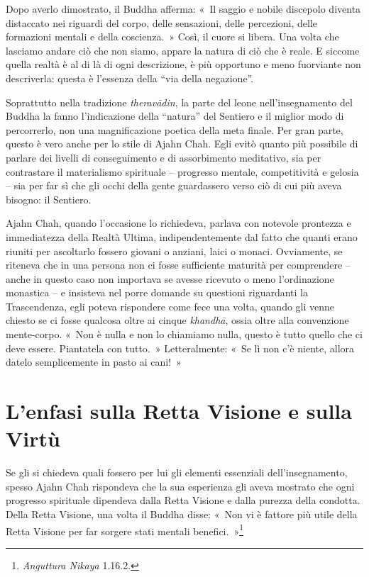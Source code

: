 Dopo averlo dimostrato, il Buddha afferma: «~Il saggio e nobile
discepolo diventa distaccato nei riguardi del corpo, delle sensazioni,
delle percezioni, delle formazioni mentali e della coscienza.~» Così, il
cuore si libera. Una volta che lasciamo andare ciò che non siamo, appare
la natura di ciò che è reale. E siccome quella realtà è al di là di ogni
descrizione, è più opportuno e meno fuorviante non descriverla: questa è
l'essenza della ``via della negazione''.

Soprattutto nella tradizione \emph{theravādin}, la parte del leone
nell'insegnamento del Buddha la fanno l'indicazione della ``natura'' del
Sentiero e il miglior modo di percorrerlo, non una magnificazione
poetica della meta finale. Per gran parte, questo è vero anche per lo
stile di Ajahn Chah. Egli evitò quanto più possibile di parlare dei
livelli di conseguimento e di assorbimento meditativo, sia per
contrastare il materialismo spirituale -- progresso mentale,
competitività e gelosia -- sia per far sì che gli occhi della gente
guardassero verso ciò di cui più aveva bisogno: il Sentiero.

Ajahn Chah, quando l'occasione lo richiedeva, parlava con notevole
prontezza e immediatezza della Realtà Ultima, indipendentemente dal
fatto che quanti erano riuniti per ascoltarlo fossero giovani o anziani,
laici o monaci. Ovviamente, se riteneva che in una persona non ci fosse
sufficiente maturità per comprendere -- anche in questo caso non
importava se avesse ricevuto o meno l'ordinazione monastica -- e
insisteva nel porre domande su questioni riguardanti la Trascendenza,
egli poteva rispondere come fece una volta, quando gli venne chiesto se
ci fosse qualcosa oltre ai cinque \emph{khandhā}, ossia oltre alla
convenzione mente-corpo. «~Non è nulla e non lo chiamiamo nulla, questo
è tutto quello che ci deve essere. Piantatela con tutto.~»
Letteralmente: «~Se lì non c'è niente, allora datelo semplicemente in
pasto ai cani!~»

\section{L'enfasi sulla Retta Visione e sulla Virtù}

Se gli si chiedeva quali fossero per lui gli elementi essenziali
dell'insegnamento, spesso Ajahn Chah rispondeva che la sua esperienza
gli aveva mostrato che ogni progresso spirituale dipendeva dalla Retta
Visione e dalla purezza della condotta. Della Retta Visione, una volta
il Buddha disse: «~Non vi è fattore più utile della Retta Visione per
far sorgere stati mentali benefici.~»\footnote{\emph{Anguttura Nikaya}
  1.16.2.}

